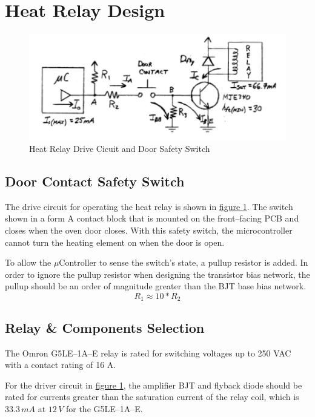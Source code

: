\documentclass[10pt, twocolumn]{article}
\begin{document}
\section{Heat Relay Design}

\begin{figure}
	\centering
	\includegraphics[width=\columnwidth]{Figures/relay-drive-circuit.pdf}
	\caption{Heat Relay Drive Cicuit and Door Safety Switch}
	\label{relay-drive-circuit}
\end{figure}

\subsection{Door Contact Safety Switch}

The drive circuit for operating the heat relay is shown in
\hyperref[relay-drive-circuit]{figure \ref{relay-drive-circuit}}.
The switch shown in a form A contact block that is mounted on the front--facing PCB
and closes when the oven door closes. With this safety switch,
the microcontroller cannot turn the heating element on when the door is open.

To allow the $\mu$Controller to sense the switch's state, a pullup resistor is added.
In order to ignore the pullup resistor when designing the transistor bias network,
the pullup should be an order of magnitude greater than the BJT base bias network.
\begin{equation}
R_{1}\approx 10*R_{2}
\label{heat-relay-pullup-eq}
\end{equation}

\subsection{Relay \& Components Selection}

The Omron G5LE--1A--E relay is rated for switching voltages up to 250 VAC
with a contact rating of 16 A. 

For the driver circuit in
\hyperref[relay-drive-circuit]{figure \ref{relay-drive-circuit}},
the amplifier BJT and flyback diode should be rated for currents
greater than the saturation current of the relay coil,
which is $33.3\,mA$ at $12\,V$ for the G5LE--1A--E.
\end{document}

